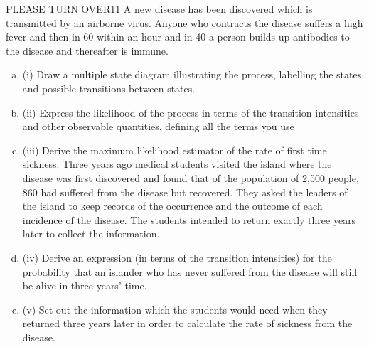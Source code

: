 \documentclass[a4paper,12pt]{article}
\begin{document}
PLEASE TURN OVER11
A new disease has been discovered which is transmitted by an airborne virus.
Anyone who contracts the disease suffers a high fever and then in 60%
within an hour and in 40%
a person builds up antibodies to the disease and thereafter is immune.
\begin{enumerate}[(a)]
\item (i) Draw a multiple state diagram illustrating the process, labelling the states and
possible transitions between states.
\item 
(ii) Express the likelihood of the process in terms of the transition intensities and
other observable quantities, defining all the terms you use
\item 
(iii) Derive the maximum likelihood estimator of the rate of first time sickness.
\smallskip
Three years ago medical students visited the island where the disease was first
discovered and found that of the population of 2,500 people, 860 had suffered from
the disease but recovered. They asked the leaders of the island to keep records of the
occurrence and the outcome of each incidence of the disease. The students intended
to return exactly three years later to collect the information.
\item 
(iv) Derive an expression (in terms of the transition intensities) for the probability
that an islander who has never suffered from the disease will still be alive in
three years’ time.
\item 
(v) Set out the information which the students would need when they returned three years later in order to calculate the rate of sickness from the disease. 
\end{enumerate}
\newpage
\end{document}
